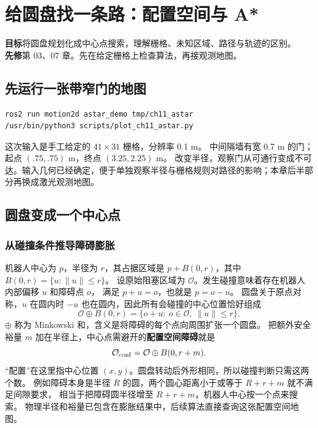 \chapter{给圆盘找一条路：配置空间与 A*}
\begin{notebox}
\textbf{目标}\quad 将圆盘规划化成中心点搜索，理解栅格、未知区域、路径与轨迹的区别。\\
\textbf{先修}\quad 第 03、07 章。先在给定栅格上检查算法，再接观测地图。
\end{notebox}

\section{先运行一张带窄门的地图}
\begin{lstlisting}[language=bash]
ros2 run motion2d astar_demo tmp/ch11_astar
/usr/bin/python3 scripts/plot_ch11_astar.py
\end{lstlisting}
这次输入是手工给定的 $41\times31$ 栅格，分辨率 0.1 m。
中间隔墙有宽 0.7 m 的门；起点 $(.75,.75)$ m，终点 $(3.25,2.25)$ m。
改变半径，观察门从可通行变成不可达。输入几何已经确定，便于单独观察半径与栅格规则对路径的影响；本章后半部分再换成激光观测地图。

\section{圆盘变成一个中心点}
\subsection{从碰撞条件推导障碍膨胀}
机器人中心为 $p$，半径为 $r$，其占据区域是
$p+B(0,r)$，其中 $B(0,r)=\{u:\|u\|\leq r\}$。
设原始阻塞区域为 $\mathcal O$。发生碰撞意味着存在机器人内部偏移 $u$ 和障碍点 $o$，
满足 $p+u=o$，也就是 $p=o-u$。
圆盘关于原点对称，$u$ 在圆内时 $-u$ 也在圆内，因此所有会碰撞的中心位置恰好组成
\begin{equation}
\mathcal O\oplus B(0,r)=\{o+u:\ o\in\mathcal O,\ \|u\|\leq r\}.
\end{equation}
$\oplus$ 称为 Minkowski 和，含义是将障碍的每个点向周围扩张一个圆盘。
把额外安全裕量 $m$ 加在半径上，中心点需避开的\textbf{配置空间障碍}就是
\begin{equation}
\mathcal O_{\rm conf}=\mathcal O\oplus B(0,r+m).
\end{equation}
“配置”在这里指中心位置 $(x,y)$。圆盘转动后外形相同，所以碰撞判断只需这两个数。
例如障碍本身是半径 $R$ 的圆，两个圆心距离小于或等于 $R+r+m$ 就不满足间隙要求，
相当于把障碍圆半径增至 $R+r+m$，机器人中心按一个点来搜索。
物理半径和裕量已包含在膨胀结果中，后续算法直接查询这张配置空间地图。

